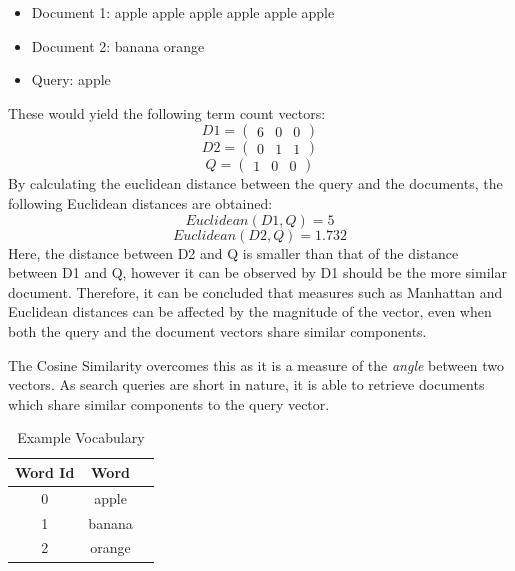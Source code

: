 \documentclass[sigconf,nonacm=true]{acmart}
\begin{document}
\begin{itemize}
	\item Document 1: apple apple apple apple apple apple 
	\item Document 2: banana orange
	\item Query: apple
\end{itemize}
These would yield the following term count vectors:
\begin{displaymath}
	D1 = \begin{pmatrix}6 & 0 & 0\end{pmatrix}
\end{displaymath}
\begin{displaymath}
	D2 = \begin{pmatrix}0 & 1 & 1\end{pmatrix}
\end{displaymath}
\begin{displaymath}
	Q = \begin{pmatrix}1 & 0 & 0\end{pmatrix}
\end{displaymath}
By calculating the euclidean distance between the query and the documents,
the following Euclidean distances are obtained:
\begin{displaymath}
	Euclidean(D1,Q) = 5
\end{displaymath}
\begin{displaymath}
	Euclidean(D2,Q) = 1.732
\end{displaymath}
Here, the distance between D2 and Q is smaller than that of the distance
between D1 and Q, however it can be observed by D1 should be the more similar
document. Therefore, it can be concluded that measures such as Manhattan and
Euclidean distances can be affected by the magnitude of the vector, even when
both the query and the document vectors share similar components.

The Cosine Similarity overcomes this as it is a measure of the \textit{angle}
between two vectors. As search queries are short in nature, it is able to retrieve
documents which share similar components to the query vector.

\begin{table}
	\caption{Example Vocabulary}
	\label{tab:vocab}
	\begin{tabular}{ccl}
		\toprule
		Word Id&Word\\
		\midrule
		0 & apple\\
		1 & banana\\
		2 & orange\\
		\bottomrule
	\end{tabular}
\end{table}
\end{document}
